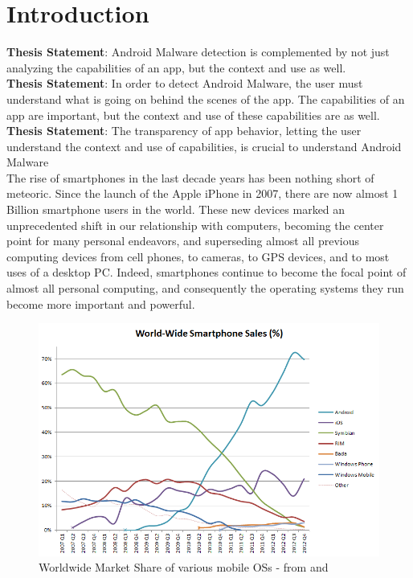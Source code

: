 \chapter{Introduction}
\label{sec:intro}

\textbf{Thesis Statement}: Android Malware detection is complemented by not just analyzing the capabilities of an app, but the context and use as well.\\
\textbf{Thesis Statement}: In order to detect Android Malware, the user must understand what is going on behind the scenes of the app. The capabilities of an app are important, but the context and use of these capabilities are as well.\\
\textbf{Thesis Statement}: The transparency of app behavior, letting the user understand the context and use of capabilities, is crucial to understand Android Malware\\


The rise of smartphones in the last decade years has been nothing short of meteoric. Since the launch of the Apple iPhone in 2007, there are now almost 1 Billion smartphone users in the world\citep{kpcbinternetreport2012}. These new devices marked an unprecedented shift in our relationship with computers, becoming the center point for many personal endeavors, and superseding almost all previous computing devices from cell phones, to cameras, to GPS devices, and to most uses of a desktop PC\citep{hua2012introduction}. Indeed, smartphones continue to become the focal point of almost all personal computing, and consequently the operating systems they run become more important and powerful.

\begin{figure}[h]
\begin{center}
\includegraphics[width=0.8\columnwidth]{figs/World_Wide_Smartphone_Sales_Share}
\caption{Worldwide Market Share of various mobile OSs - from \citep{wikimobileshare} and \citep{gartnerq42012}}
\label{fig:mobileshares}
\end{center}
\end{figure}



